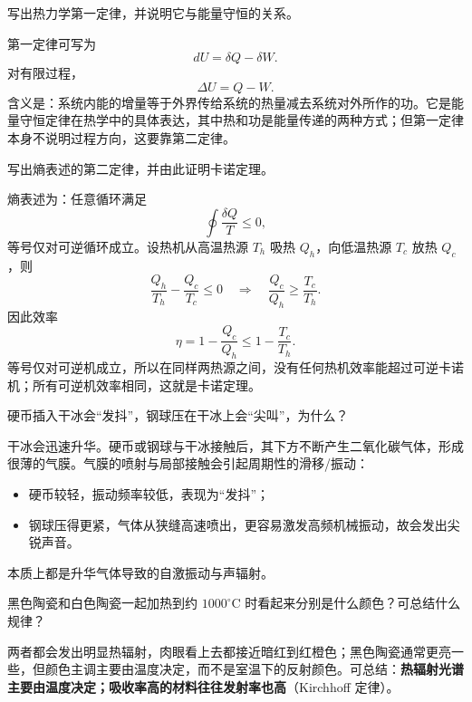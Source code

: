 ﻿

\begin{question}
写出热力学第一定律，并说明它与能量守恒的关系。
\begin{solution}
第一定律可写为
\[
dU=\delta Q-\delta W.
\]
对有限过程，
\[
\Delta U=Q-W.
\]
含义是：系统内能的增量等于外界传给系统的热量减去系统对外所作的功。它是能量守恒定律在热学中的具体表达，其中热和功是能量传递的两种方式；但第一定律本身不说明过程方向，这要靠第二定律。
\end{solution}
\end{question}

\begin{question}
写出熵表述的第二定律，并由此证明卡诺定理。
\begin{solution}
熵表述为：任意循环满足
\[
\oint \frac{\delta Q}{T}\le 0,
\]
等号仅对可逆循环成立。设热机从高温热源 $T_h$ 吸热 $Q_h$，向低温热源 $T_c$ 放热 $Q_c$，则
\[
\frac{Q_h}{T_h}-\frac{Q_c}{T_c}\le 0
\quad\Rightarrow\quad
\frac{Q_c}{Q_h}\ge \frac{T_c}{T_h}.
\]
因此效率
\[
\eta=1-\frac{Q_c}{Q_h}\le 1-\frac{T_c}{T_h}.
\]
等号仅对可逆机成立，所以在同样两热源之间，没有任何热机效率能超过可逆卡诺机；所有可逆机效率相同，这就是卡诺定理。
\end{solution}
\end{question}

\begin{question}
硬币插入干冰会“发抖”，钢球压在干冰上会“尖叫”，为什么？
\begin{solution}
干冰会迅速升华。硬币或钢球与干冰接触后，其下方不断产生二氧化碳气体，形成很薄的气膜。气膜的喷射与局部接触会引起周期性的滑移/振动：
\begin{itemize}[leftmargin=1.8em,itemsep=0.2em]
\item 硬币较轻，振动频率较低，表现为“发抖”；
\item 钢球压得更紧，气体从狭缝高速喷出，更容易激发高频机械振动，故会发出尖锐声音。
\end{itemize}
本质上都是升华气体导致的自激振动与声辐射。

\end{solution}
\end{question}

\begin{question}
黑色陶瓷和白色陶瓷一起加热到约 $1000^\circ\mathrm C$ 时看起来分别是什么颜色？可总结什么规律？
\begin{solution}
两者都会发出明显热辐射，肉眼看上去都接近暗红到红橙色；黑色陶瓷通常更亮一些，但颜色主调主要由温度决定，而不是室温下的反射颜色。可总结：\textbf{热辐射光谱主要由温度决定；吸收率高的材料往往发射率也高}（Kirchhoff 定律）。
\end{solution}
\end{question}

